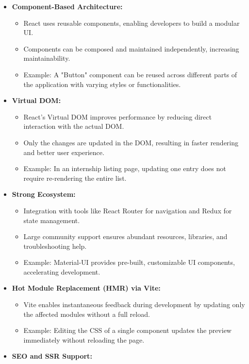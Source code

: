 \begin{itemize}
    \item \textbf{Component-Based Architecture:}
    \begin{itemize}
        \item React uses reusable components, enabling developers to build a modular UI.
        \item Components can be composed and maintained independently, increasing maintainability.
        \item Example: A "Button" component can be reused across different parts of the application with varying styles or functionalities.
    \end{itemize}
    \item \textbf{Virtual DOM:}
    \begin{itemize}
        \item React’s Virtual DOM improves performance by reducing direct interaction with the actual DOM.
        \item Only the changes are updated in the DOM, resulting in faster rendering and better user experience.
        \item Example: In an internship listing page, updating one entry does not require re-rendering the entire list.
    \end{itemize}
    \item \textbf{Strong Ecosystem:}
    \begin{itemize}
        \item Integration with tools like React Router for navigation and Redux for state management.
        \item Large community support ensures abundant resources, libraries, and troubleshooting help.
        \item Example: Material-UI provides pre-built, customizable UI components, accelerating development.
    \end{itemize}
    \item \textbf{Hot Module Replacement (HMR) via Vite:}
    \begin{itemize}
        \item Vite enables instantaneous feedback during development by updating only the affected modules without a full reload.
        \item Example: Editing the CSS of a single component updates the preview immediately without reloading the page.
    \end{itemize}
    \item \textbf{SEO and SSR Support:}

\end{itemize}
